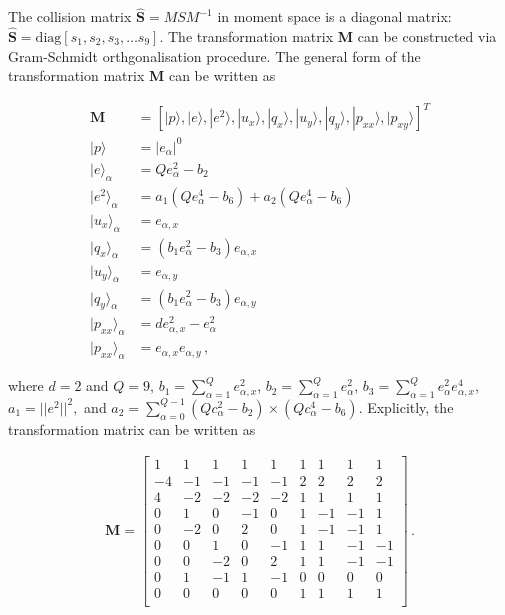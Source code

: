 The collision matrix $\hat{\mathbf{S}} = MSM^{-1}$ in moment space is a 
diagonal matrix: $\hat{\mathbf{S}} =\mbox{diag} \left[ s_1, s_2, s_3,\dots s_9  
\right]$. The transformation matrix \textbf{M} can be constructed via 
Gram-Schmidt orthgonalisation procedure. The general form of the transformation 
matrix \textbf{M} can be written as

\begin{align}
\mathbf{M} & =  
\left[|p\rangle,|e\rangle,|e^2\rangle,|u_x\rangle,|q_x\rangle,|u_y\rangle,
			|q_y\rangle,|p_{xx}\rangle,|p_{xy}\rangle\right]^T \\
|p\rangle & =  |\mathit{e}_{\alpha}|^0\\
|e\rangle_{\alpha} & = \mathit{Q}e_{\alpha}^2-b_2\\
|e^2\rangle_{\alpha} & =  	
		a_1(\mathit{Q}e_{\alpha}^4-b_6)+a_2(\mathit{Q}e_{\alpha}^4-b_6)\\
|u_x\rangle_{\alpha} & = e_{\alpha,x} \\
|q_x\rangle_{\alpha} & = (\mathit{b}_1e_{\alpha}^2-b_3)e_{\alpha,x}\\
|u_y\rangle_{\alpha} & = e_{\alpha,y}\\
|q_y\rangle_{\alpha} & = (\mathit{b}_1e_{\alpha}^2-b_3)e_{\alpha,y}\\
|p_{xx}\rangle_{\alpha} & = \mathit{d}e_{\alpha,x}^2-e_{\alpha}^2\\
|p_{xx}\rangle_{\alpha}  & = e_{\alpha,x}e_{\alpha,y} \,,
\end{align}

\noindent where $d = 2$ and $Q = 9$, $b_1=\sum_{\alpha=1}^{Q}e_{\alpha,x}^2$, 
$b_2=\sum_{\alpha=1}^{Q}e_{\alpha}^2$, 
$b_3=\sum_{\alpha=1}^{Q}e_{\alpha}^2e_{\alpha,x}^4$, $a_1=||e^2||^2,$ and 
$a_2=\sum_{\alpha=0}^{Q-1}(Qc_{\alpha}^2-b_2)\times(Qc_{\alpha}^4-b_6)$. 
Explicitly, the transformation matrix can be written as

\begin{align}
\mathbf{M}= \begin{bmatrix}
 1 &  1 &  1 &  1 &  1 &  1 &  1 &  1 &  1 \\
-4 & -1 & -1 & -1 & -1 &  2 &  2 &  2 &  2 \\ 
 4 & -2 & -2 & -2 & -2 &  1 &  1 &  1 &  1 \\
 0 &  1 &  0 & -1 &  0 &  1 & -1 & -1 &  1 \\
 0 & -2 &  0 &  2 &  0 &  1 & -1 & -1 &  1 \\
 0 &  0 &  1 &  0 & -1 &  1 &  1 & -1 & -1 \\
 0 &  0 & -2 &  0 &  2 &  1 &  1 & -1 & -1 \\
 0 &  1 & -1 &  1 & -1 &  0 &  0 &  0 &  0 \\
 0 &  0 &  0 &  0 &  0 &  1 &  1 &  1 &  1 \\
\end{bmatrix}\,.
\end{align}

